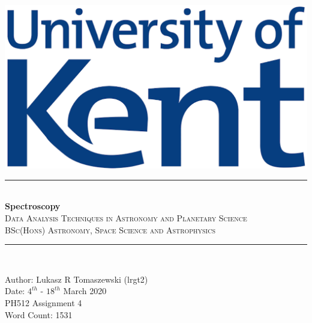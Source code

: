 \documentclass[12pt]{article}
\title{}
\begin{document}
\begin{titlepage}
\newcommand{\HRule}{\rule{\linewidth}{0.5mm}}
\begin{centering} 

\includegraphics[scale=0.7]{Images/Uni_of_Kent.png}\\[0.3cm]
\HRule \\ [0.3cm]
\Huge{\bfseries{Spectroscopy}} \\
\textsc{\large Data Analysis Techniques in Astronomy and Planetary Science}\\ [-0.1cm]
\textsc{\large BSc(Hons) Astronomy, Space Science and Astrophysics}\\ [-0.2cm]
\HRule \\[0.5cm]
\begin{minipage}{0.625\textwidth}
\begin{center} \large
{\large Author: Lukasz R Tomaszewski (lrgt2)} \\[0.2cm]
{\large Date: $4^{th}$ - $18^{th}$ March 2020}\\[0.2cm]
{\large PH512 Assignment 4} \\[0.2cm]
{\large Word Count: 1531} \\
\end{center}
\end{minipage}\\[0.5cm]
\end{centering} 
\begin{tableofcontents}
\end{tableofcontents}
\end{titlepage}
\newpage
\end{document}

